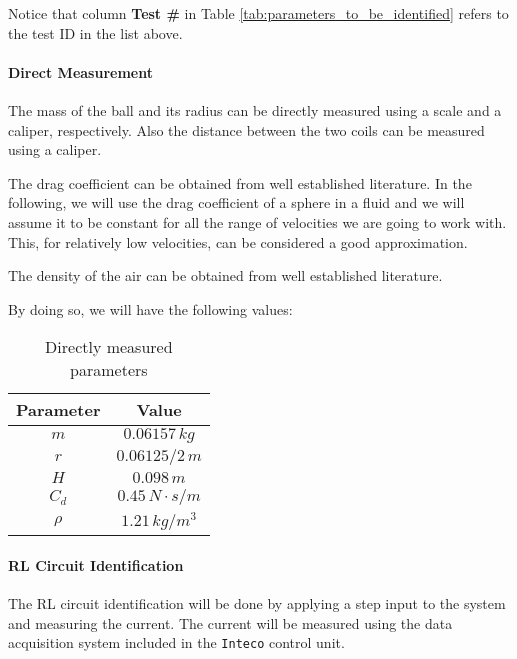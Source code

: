 Notice that column \textbf{Test \#} in Table \ref{tab:parameters_to_be_identified} refers to the test ID in the list above.

\paragraph{Direct Measurement}

The mass of the ball and its radius can be directly measured using a scale and a caliper, respectively.
Also the distance between the two coils can be measured using a caliper.

The drag coefficient can be obtained from well established literature.
In the following, we will use the drag coefficient of a sphere in a fluid and we will assume it to be constant for all the range of velocities we are going to work with.
This, for relatively low velocities, can be considered a good approximation.

The density of the air can be obtained from well established literature.

By doing so, we will have the following values:

\begin{table}[H]

    \centering
    \begin{tabular}{|c|c|}
        \hline
        \textbf{Parameter} & \textbf{Value}        \\
        \hline
        $m$                & $0.06157 \, kg$       \\
        $r$                & $0.06125/2 \, m$      \\
        $H$                & $0.098 \, m$          \\
        $C_d$              & $0.45 \, N \cdot s/m$ \\
        $\rho$             & $1.21 \, kg/m^3$      \\
        \hline
    \end{tabular}

    \caption{Directly measured parameters}
    \label{tab:directly_measured_parameters}

\end{table}

\paragraph{RL Circuit Identification}

The RL circuit identification will be done by applying a step input to the system and measuring the current.
The current will be measured using the data acquisition system included in the \texttt{Inteco} control unit.

